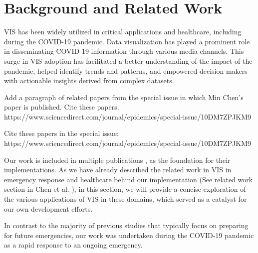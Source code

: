 \section{Background and Related Work}

\ac{VIS} has been widely utilized in critical applications and healthcare, including during the COVID-19 pandemic.
Data visualization has played a prominent role in disseminating COVID-19 information through various media channels.
This surge in \ac{VIS} adoption has facilitated a better understanding of the impact of the pandemic, helped identify trends and patterns, and empowered decision-makers with actionable insights derived from complex datasets.

Add a paragraph of related papers from the special issue in which Min Chen's paper is published.  Cite these papers.
https://www.sciencedirect.com/journal/epidemics/special-issue/10DM7ZPJKM9

Cite these papers in the special issue:
https://www.sciencedirect.com/journal/epidemics/special-issue/10DM7ZPJKM9

Our work is included in multiple publications \cite{chen2022RAMPVIS,dykes2022Visualizationb,khan2022Propagating,rydow2023RAMPVIS}, as the foundation for their implementations.
As we have already described the related work in \ac{VIS} in emergency response and healthcare behind our implementation (See related work section in Chen et al. \cite{chen2022RAMPVIS}), in this section, we will provide a concise exploration of the various applications of \ac{VIS} in these domains, which served as a catalyst for our own development efforts.

In contrast to the majority of previous studies that typically focus on preparing for future emergencies, our work was undertaken during the COVID-19 pandemic as a rapid response to an ongoing emergency.